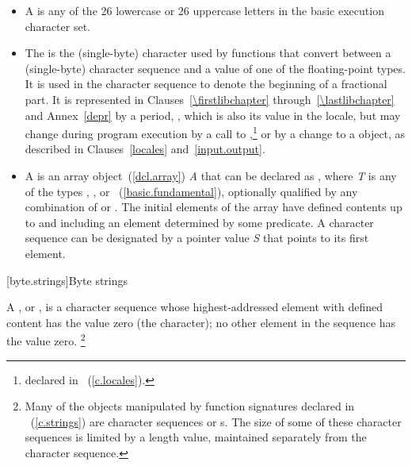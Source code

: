 \begin{itemize}
\item
A
is any of the 26 lowercase or 26
%
%
uppercase letters in the basic execution character set.
\item
The
is the
%
(single-byte) character used by functions that convert between a (single-byte)
character sequence and a value of one of the floating-point types.
It is used
in the character sequence to denote the beginning of a fractional part.
It is
represented in Clauses~\ref{\firstlibchapter} through~\ref{\lastlibchapter}
and Annex~\ref{depr} by a period,
%
,
which is
also its value in the 
locale, but may change during program
execution by a call to
,\footnote{declared in
~(\ref{c.locales}).
%
%
%
}
or by a change to a
object, as described in Clauses~\ref{locales} and~\ref{input.output}.
\item
A
is an array object~(\ref{dcl.array}) \textit{A} that
can be declared as
,
where \textit{T} is any of the types
,
,
or
~(\ref{basic.fundamental}), optionally qualified by any combination of
or
.
The initial elements of the
array have defined contents up to and including an element determined by some
predicate.
A character sequence can be designated by a pointer value
\textit{S} that points to its first element.
\end{itemize}

[byte.strings]{Byte strings}

\pnum
A
%
%
,
or \ntbs,
is a character sequence whose highest-addressed element
with defined content has the value zero
(the
character); no other element in the sequence has the value zero.%
%
%
\footnote{Many of the objects manipulated by
function signatures declared in
~(\ref{c.strings}) are character sequences or \ntbs{}s.
%
%
The size of some of these character sequences is limited by
a length value, maintained separately from the character sequence.}

